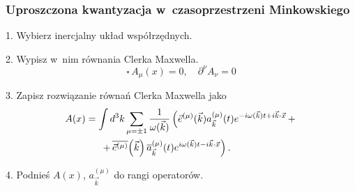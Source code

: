 \documentclass[10pt,t]{beamer}
\begin{document}
\begin{frame}
  \frametitle{Uproszczona kwantyzacja w~czasoprzestrzeni Minkowskiego}


  1. Wybierz inercjalny układ współrzędnych.

  2. Wypisz w~nim równania Clerka Maxwella.
  \begin{equation}
    \label{eq:Czemu-rozwazanie-03}
    \square \, A_{ \mu }( x ) = 0, \quad \partial^{ \nu } A_{ \nu } = 0
  \end{equation}

  \vspace{-1.5em}



  3. Zapisz rozwiązanie równań Clerka Maxwella jako
  \begin{equation}
    \label{eq:Czemu-rozwazanie-04}
    \begin{split}
      A( x )
      &=
        \int d^{ 3 }k \sum_{ \mu = \pm 1 } \frac{ 1 }{ \omega( \vec{ k } ) }
        \left( \vec{ e }^{ ( \mu ) }( \vec{ k } ) a_{ \vec{ k } }^{ ( \mu ) }( t )
        e^{ -i \omega( \vec{ k } ) t + i \vec{ k } \cdot \vec{ x } } \, + \right. \\
      &\hspace{1.5em}
        \left. + \, \overline{ \vec{ e }^{ ( \mu ) } }\!\left( \vec{ k } \right)
        \overline{ a }_{ \vec{ k } }^{ ( \mu ) }( t )
        e^{ i \omega( \vec{ k } ) t - i \vec{ k } \cdot \vec{ x } } \right).
    \end{split}
  \end{equation}

  \vspace{-1em}



  4. Podnieś $A( x )$, $a_{ \vec{ k } }^{ ( \mu ) }$ do rangi
  operatorów.

\end{frame}
\end{document}
